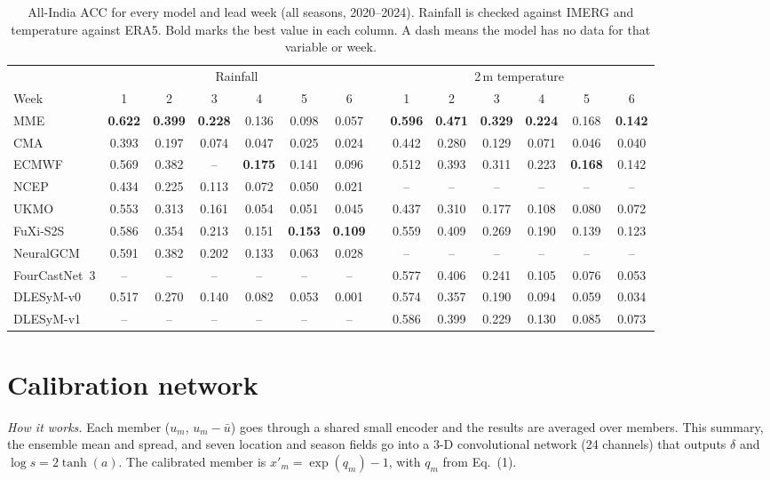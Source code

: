 \documentclass[11pt,a4paper]{article}
\begin{document}
\begin{table}[H]
\centering\footnotesize
\caption{All-India ACC for every model and lead week (all seasons, 2020--2024). Rainfall is checked against IMERG and
temperature against ERA5. Bold marks the best value in each column. A dash means the model has no data for that variable or week.}
\label{tab:accall}
\setlength{\tabcolsep}{4.6pt}
\begin{tabular}{@{}l cccccc c cccccc@{}}
\toprule
 & \multicolumn{6}{c}{Rainfall} & & \multicolumn{6}{c}{2\,m temperature} \\
\cmidrule(lr){2-7}\cmidrule(lr){9-14}
Week & 1 & 2 & 3 & 4 & 5 & 6 & & 1 & 2 & 3 & 4 & 5 & 6 \\
\midrule
MME           & \textbf{0.622} & \textbf{0.399} & \textbf{0.228} & 0.136 & 0.098 & 0.057 & & \textbf{0.596} & \textbf{0.471} & \textbf{0.329} & \textbf{0.224} & 0.168 & \textbf{0.142} \\
\addlinespace[2pt]
CMA           & 0.393 & 0.197 & 0.074 & 0.047 & 0.025 & 0.024 & & 0.442 & 0.280 & 0.129 & 0.071 & 0.046 & 0.040 \\
ECMWF         & 0.569 & 0.382 & --    & \textbf{0.175} & 0.141 & 0.096 & & 0.512 & 0.393 & 0.311 & 0.223 & \textbf{0.168} & 0.142 \\
NCEP          & 0.434 & 0.225 & 0.113 & 0.072 & 0.050 & 0.021 & & --    & --    & --    & --    & --    & --    \\
UKMO          & 0.553 & 0.313 & 0.161 & 0.054 & 0.051 & 0.045 & & 0.437 & 0.310 & 0.177 & 0.108 & 0.080 & 0.072 \\
\addlinespace[2pt]
FuXi-S2S      & 0.586 & 0.354 & 0.213 & 0.151 & \textbf{0.153} & \textbf{0.109} & & 0.559 & 0.409 & 0.269 & 0.190 & 0.139 & 0.123 \\
NeuralGCM     & 0.591 & 0.382 & 0.202 & 0.133 & 0.063 & 0.028 & & --    & --    & --    & --    & --    & --    \\
FourCastNet~3 & --    & --    & --    & --    & --    & --    & & 0.577 & 0.406 & 0.241 & 0.105 & 0.076 & 0.053 \\
DLESyM-v0     & 0.517 & 0.270 & 0.140 & 0.082 & 0.053 & 0.001 & & 0.574 & 0.357 & 0.190 & 0.094 & 0.059 & 0.034 \\
DLESyM-v1     & --    & --    & --    & --    & --    & --    & & 0.586 & 0.399 & 0.229 & 0.130 & 0.085 & 0.073 \\
\bottomrule
\end{tabular}
\end{table}

\section{Calibration network}
\label{app:adapter}
\textit{How it works.} Each member ($u_m$, $u_m-\bar u$) goes through a shared small encoder and the results are averaged over
members. This summary, the ensemble mean and spread, and seven location and season fields go into a 3-D convolutional network
(24 channels) that outputs $\delta$ and $\log s=2\tanh(a)$. The calibrated member is $x'_m=\exp(q_m)-1$, with $q_m$ from Eq.~(1).
\end{document}
